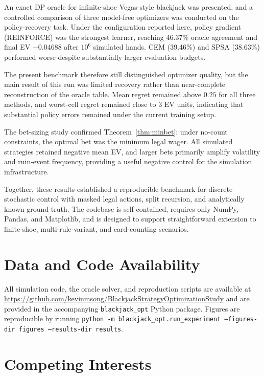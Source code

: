\documentclass[12pt]{article}
\begin{document}
An exact DP oracle for infinite-shoe Vegas-style blackjack was presented, and a
controlled comparison of three model-free optimizers was conducted on the
policy-recovery task.  Under the configuration reported here, policy gradient
(REINFORCE) was the strongest learner, reaching 46.37\% oracle agreement and
final EV $-0.04688$ after $10^6$ simulated hands.  CEM (39.46\%) and SPSA (38.63\%)
performed worse despite substantially larger evaluation budgets.

The present benchmark therefore still distinguished optimizer quality, but the main
result of this run was limited recovery rather than near-complete reconstruction of
the oracle table.  Mean regret remained above $0.25$ for all three methods, and
worst-cell regret remained close to $3$ EV units, indicating that substantial policy errors
remained under the current training setup.

The bet-sizing study confirmed Theorem~\ref{thm:minbet}: under no-count constraints,
the optimal bet was the minimum legal wager.  All simulated strategies retained negative
mean EV, and larger bets primarily amplify volatility and ruin-event frequency,
providing a useful negative control for the simulation infrastructure.

Together, these results established a reproducible benchmark for discrete stochastic
control with masked legal actions, split recursion, and analytically known ground
truth.  The codebase is self-contained, requires only NumPy, Pandas, and Matplotlib,
and is designed to support straightforward extension to finite-shoe, multi-rule-variant,
and card-counting scenarios.

\section*{Data and Code Availability}

All simulation code, the oracle solver, and reproduction scripts are available at
\url{https://github.com/kevinmsong/BlackjackStrategyOptimizationStudy} and are
provided in the accompanying \texttt{blackjack\_opt} Python package.  Figures are
reproducible by running \texttt{python -m blackjack\_opt.run\_experiment
--figures-dir figures --results-dir results}.

\section*{Competing Interests}
\end{document}
